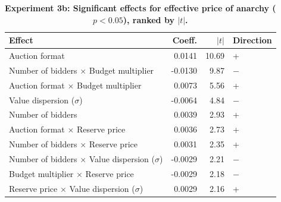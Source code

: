 \begin{table}[H]
\centering
\caption[Experiment 3b: Significant effects for effective price of anarchy ($p < 0.05$), ranked by $|t|$]{\textbf{Experiment 3b: Significant effects for effective price of anarchy ($p < 0.05$), ranked by $|t|$.}}
\label{tab:exp3b_ranked_poa}
\begin{tabular}{lrrl}
\toprule
\textbf{Effect} & \textbf{Coeff.} & \textbf{$|t|$} & \textbf{Direction} \\
\midrule
Auction format & 0.0141 & 10.69 & + \\
Number of bidders $\times$ Budget multiplier & -0.0130 & 9.87 & $-$ \\
Auction format $\times$ Budget multiplier & 0.0073 & 5.56 & + \\
Value dispersion ($\sigma$) & -0.0064 & 4.84 & $-$ \\
Number of bidders & 0.0039 & 2.93 & + \\
Auction format $\times$ Reserve price & 0.0036 & 2.73 & + \\
Number of bidders $\times$ Reserve price & 0.0031 & 2.35 & + \\
Number of bidders $\times$ Value dispersion ($\sigma$) & -0.0029 & 2.21 & $-$ \\
Budget multiplier $\times$ Reserve price & -0.0029 & 2.18 & $-$ \\
Reserve price $\times$ Value dispersion ($\sigma$) & 0.0029 & 2.16 & + \\
\bottomrule
\end{tabular}
\end{table}

